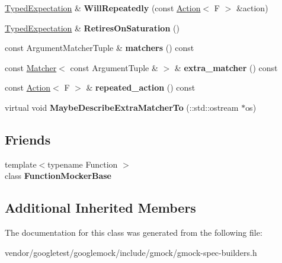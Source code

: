 \begin{DoxyCompactItemize}
\mbox{\label{classtesting_1_1internal_1_1_typed_expectation_a73586c1adb458c5c431df9679e46f5f1}} 
\hyperlink{classtesting_1_1internal_1_1_typed_expectation}{Typed\+Expectation} \& {\bfseries Will\+Repeatedly} (const \hyperlink{classtesting_1_1_action}{Action}$<$ F $>$ \&action)
\item 
\mbox{\label{classtesting_1_1internal_1_1_typed_expectation_ae7c42958a5d2c336ba7a42a871bf7709}} 
\hyperlink{classtesting_1_1internal_1_1_typed_expectation}{Typed\+Expectation} \& {\bfseries Retires\+On\+Saturation} ()
\item 
\mbox{\label{classtesting_1_1internal_1_1_typed_expectation_ad1a18c39511a2f6fda425881cddcc31a}} 
const Argument\+Matcher\+Tuple \& {\bfseries matchers} () const
\item 
\mbox{\label{classtesting_1_1internal_1_1_typed_expectation_a0ee00342b872ae257cae31bc86b9a34b}} 
const \hyperlink{classtesting_1_1_matcher}{Matcher}$<$ const Argument\+Tuple \& $>$ \& {\bfseries extra\+\_\+matcher} () const
\item 
\mbox{\label{classtesting_1_1internal_1_1_typed_expectation_a2b32621ac4d71c1a71893eb0499f723d}} 
const \hyperlink{classtesting_1_1_action}{Action}$<$ F $>$ \& {\bfseries repeated\+\_\+action} () const
\item 
\mbox{\label{classtesting_1_1internal_1_1_typed_expectation_ab019251041a408dc5a5d8ae216be53f4}} 
virtual void {\bfseries Maybe\+Describe\+Extra\+Matcher\+To} (\+::std\+::ostream $\ast$os)
\end{DoxyCompactItemize}
\subsection*{Friends}
\begin{DoxyCompactItemize}
\item 
\mbox{\label{classtesting_1_1internal_1_1_typed_expectation_a1771ea4a3d92d8b2ff0f0aa6fc40ff55}} 
{\footnotesize template$<$typename Function $>$ }\\class {\bfseries Function\+Mocker\+Base}
\end{DoxyCompactItemize}
\subsection*{Additional Inherited Members}


The documentation for this class was generated from the following file\+:\begin{DoxyCompactItemize}
\item 
vendor/googletest/googlemock/include/gmock/gmock-\/spec-\/builders.\+h\end{DoxyCompactItemize}
